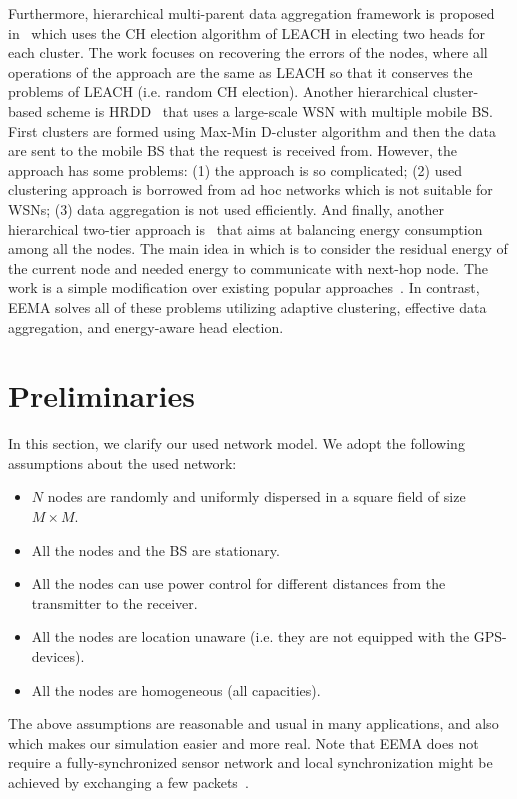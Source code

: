 \documentclass[journal]{IEEEtran}
\begin{document}
Furthermore, hierarchical multi-parent data aggregation framework is proposed in~\cite{alemu2010} which uses the CH election algorithm of LEACH in electing two heads for each cluster.  The work focuses on recovering the errors of the nodes, where all operations of the approach are the same as LEACH so that it conserves the problems of  LEACH (i.e. random CH election).  Another hierarchical cluster-based scheme is HRDD~\cite{HRDD} that uses a large-scale WSN with multiple mobile BS.  First clusters are formed using Max-Min D-cluster algorithm and then the data are sent to the mobile BS that the request is received from.  However, the approach has some problems: (1) the approach is so complicated; (2) used clustering approach is borrowed from ad hoc networks which is not suitable for WSNs; (3) data aggregation is not used efficiently.
And finally, another hierarchical two-tier approach is~\cite{bulgaria2012} that aims at balancing energy consumption among all the nodes.  The main idea in which is to consider the residual energy of the current node and needed energy to communicate with next-hop node.  The work is a simple modification over existing popular approaches~\cite{Heinzelman2002,SEP2004}.  In contrast, EEMA solves all of these problems utilizing adaptive clustering, effective data aggregation, and energy-aware head election.


\section{Preliminaries}
\label{sec:net-mod}
In this section, we clarify our used network model. We adopt the following assumptions about the used network:
\begin{itemize}

\item	$N$ nodes are randomly and uniformly dispersed in a square field of size $M \times M$.
\item	All the nodes and the BS are stationary. 
\item	All the nodes can use power control for different distances from the transmitter to the receiver.
\item	All the nodes are location unaware (i.e. they are not equipped with the GPS-devices). 
\item	All the nodes are homogeneous (all capacities).


\end{itemize}

The above assumptions are reasonable and usual in many applications, and also which makes our simulation easier and more real. Note that EEMA does not require a fully-synchronized sensor network and local synchronization might be achieved by exchanging a few packets~\cite{zhu}.
\end{document}
